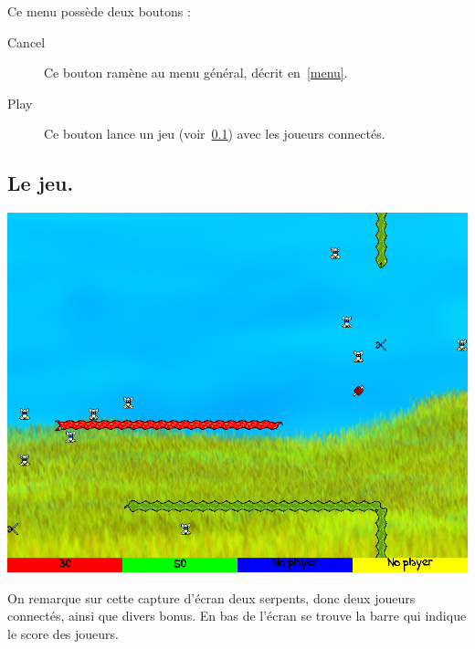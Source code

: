 \documentclass{article}
\begin{document}
Ce menu possède deux boutons :
\begin{description}
	\item[Cancel] Ce bouton ramène au menu général, décrit en~\ref{menu}.
	\item[Play] Ce bouton lance un jeu (voir~\ref{game}) avec les joueurs connectés.
\end{description}

\subsection{Le jeu.} \label{game}
\begin{center}
	\includegraphics[scale=0.4]{img/game.png}
\end{center}
On remarque sur cette capture d'écran deux serpents, donc deux joueurs connectés, ainsi que divers bonus. En bas de l'écran se trouve la barre qui indique le score des joueurs.
\end{document}
